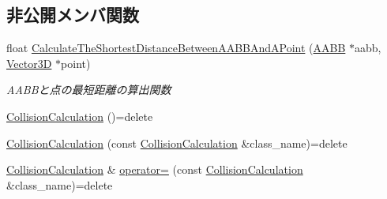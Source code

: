 \subsection*{非公開メンバ関数}
\begin{DoxyCompactItemize}
\item 
float \mbox{\hyperlink{class_collision_calculation_ac06f2aa7df28c6331070b85d48760b59}{Calculate\+The\+Shortest\+Distance\+Between\+A\+A\+B\+B\+And\+A\+Point}} (\mbox{\hyperlink{class_a_a_b_b}{A\+A\+BB}} $\ast$aabb, \mbox{\hyperlink{class_vector3_d}{Vector3D}} $\ast$point)
\begin{DoxyCompactList}\small\item\em A\+A\+B\+Bと点の最短距離の算出関数 \end{DoxyCompactList}\item 
\mbox{\hyperlink{class_collision_calculation_adfd1c367b0e22ce1240185efe11d6c98}{Collision\+Calculation}} ()=delete
\item 
\mbox{\hyperlink{class_collision_calculation_a7fa8ad5ebc7cb5554bd071756140771a}{Collision\+Calculation}} (const \mbox{\hyperlink{class_collision_calculation}{Collision\+Calculation}} \&class\+\_\+name)=delete
\item 
\mbox{\hyperlink{class_collision_calculation}{Collision\+Calculation}} \& \mbox{\hyperlink{class_collision_calculation_a20738fa64ae8749165328d48ee90d32e}{operator=}} (const \mbox{\hyperlink{class_collision_calculation}{Collision\+Calculation}} \&class\+\_\+name)=delete
\end{DoxyCompactItemize}
